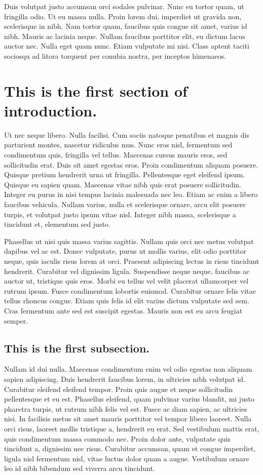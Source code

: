\documentclass[13pt, letterpaper, twoside]{book}
\begin{document}
Duis volutpat justo accumsan orci sodales pulvinar. Nunc eu tortor quam, ut fringilla odio. Ut eu massa nulla. Proin lorem dui, imperdiet ut gravida non, scelerisque in nibh. Nam tortor quam, faucibus quis congue sit amet, varius id nibh. Mauris ac lacinia neque. Nullam faucibus porttitor elit, eu dictum lacus auctor nec. Nulla eget quam nunc. Etiam vulputate mi nisi. Class aptent taciti sociosqu ad litora torquent per conubia nostra, per inceptos himenaeos.
\section{This is the first section of introduction.}
Ut nec neque libero. Nulla facilisi. Cum sociis natoque penatibus et magnis dis parturient montes, nascetur ridiculus mus. Nunc eros nisl, fermentum sed condimentum quis, fringilla vel tellus. Maecenas cursus mauris eros, sed sollicitudin erat. Duis sit amet egestas eros. Proin condimentum aliquam posuere. Quisque pretium hendrerit urna ut fringilla. Pellentesque eget eleifend ipsum. Quisque eu sapien quam. Maecenas vitae nibh quis erat posuere sollicitudin. Integer eu purus in nisi tempus lacinia malesuada nec leo. Etiam ac enim a libero faucibus vehicula. Nullam varius, nulla et scelerisque ornare, arcu elit posuere turpis, et volutpat justo ipsum vitae nisl. Integer nibh massa, scelerisque a tincidunt et, elementum sed justo.

Phasellus ut nisi quis massa varius sagittis. Nullam quis orci nec metus volutpat dapibus vel ac est. Donec vulputate, purus ut mollis varius, elit odio porttitor neque, quis iaculis risus lorem at orci. Praesent adipiscing lectus in risus tincidunt hendrerit. Curabitur vel dignissim ligula. Suspendisse neque neque, faucibus ac auctor ut, tristique quis eros. Morbi eu tellus vel velit placerat ullamcorper vel rutrum ipsum. Fusce condimentum lobortis euismod. Curabitur ornare felis vitae tellus rhoncus congue. Etiam quis felis id elit varius dictum vulputate sed sem. Cras fermentum ante sed est suscipit egestas. Mauris non est eu arcu feugiat semper.

\subsection{This is the first subsection.}
Nullam id dui nulla. Maecenas condimentum enim vel odio egestas non aliquam sapien adipiscing. Duis hendrerit faucibus lorem, in ultricies nibh volutpat id. Curabitur eleifend eleifend tempor. Proin quis augue et neque sollicitudin pellentesque et eu est. Phasellus eleifend, quam pulvinar varius blandit, mi justo pharetra turpis, ut rutrum nibh felis vel est. Fusce ac diam sapien, ac ultricies nisi. In facilisis metus sit amet mauris porttitor vel tempor libero laoreet. Nulla orci risus, laoreet mollis tristique a, hendrerit eu erat. Sed vestibulum mattis erat, quis condimentum massa commodo nec. Proin dolor ante, vulputate quis tincidunt a, dignissim nec risus. Curabitur accumsan, quam et congue imperdiet, ligula nisl fermentum nisl, vitae luctus dolor quam a augue. Vestibulum ornare leo id nibh bibendum sed viverra arcu tincidunt. 
\end{document}
